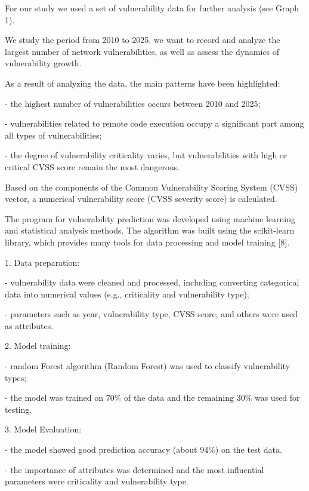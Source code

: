 \begin{multicols}{2}
For our study we used a set of vulnerability data for further analysis
(see Graph 1).

We study the period from 2010 to 2025, we want to record and analyze the
largest number of network vulnerabilities, as well as assess the
dynamics of vulnerability growth.

As a result of analyzing the data, the main patterns have been
highlighted:

- the highest number of vulnerabilities occurs between 2010 and 2025;

- vulnerabilities related to remote code execution occupy a significant
part among all types of vulnerabilities;

- the degree of vulnerability criticality varies, but vulnerabilities
with high or critical CVSS score remain the most dangerous.

Based on the components of the Common Vulnerability Scoring System
(CVSS) vector, a numerical vulnerability score (CVSS severity score) is
calculated.

The program for vulnerability prediction was developed using machine
learning and statistical analysis methods. The algorithm was built using
the scikit-learn library, which provides many tools for data processing
and model training {[}8{]}.

1. Data preparation:

- vulnerability data were cleaned and processed, including converting
categorical data into numerical values (e.g., criticality and
vulnerability type);

- parameters such as year, vulnerability type, CVSS score, and others
were used as attributes.

2. Model training:

- random Forest algorithm (Random Forest) was used to classify
vulnerability types;

- the model was trained on 70\% of the data and the remaining 30\% was
used for testing.

3. Model Evaluation:

- the model showed good prediction accuracy (about 94\%) on the test
data.

- the importance of attributes was determined and the most influential
parameters were criticality and vulnerability type.
\end{multicols}

